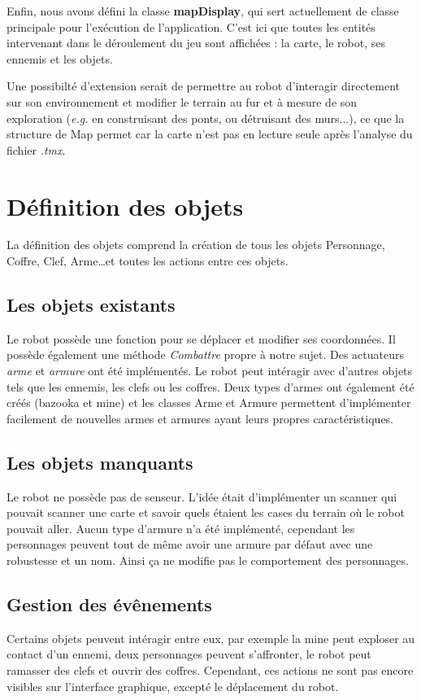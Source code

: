 \documentclass[a4paper 12pts]{article}
\begin{document}
Enfin, nous avons défini la classe \textbf{mapDisplay}, qui sert actuellement de classe principale pour l'exécution de l'application. C'est ici que toutes les entités intervenant dans le déroulement du jeu sont affichées : la carte, le robot, ses ennemis et les objets.

Une possibilté d'extension serait de permettre au robot d'interagir directement sur son environnement et modifier le terrain au fur et à mesure de son exploration (\emph{e.g.} en construisant des ponts, ou détruisant des murs...), ce que la structure de Map permet car la carte n'est pas en lecture seule après l'analyse du fichier \emph{.tmx}. 



\section{Définition des objets}
La définition des objets comprend la création de tous les objets Personnage, Coffre, Clef, Arme\ldots et toutes les actions entre ces objets.

\subsection{Les objets existants}
Le robot possède une fonction pour se déplacer et modifier ses coordonnées. Il possède également une méthode \emph{Combattre} propre à notre sujet. Des actuateurs \emph{arme} et \emph{armure} ont été implémentés. Le robot peut intéragir avec d'autres objets tels que les ennemis, les clefs ou les coffres. Deux types d'armes ont également été créés (bazooka et mine) et les classes Arme et Armure permettent d'implémenter facilement de nouvelles armes et armures ayant leurs propres caractéristiques.

\subsection{Les objets manquants}
Le robot ne possède pas de senseur. L'idée était d'implémenter un scanner qui pouvait scanner une carte et savoir quels étaient les cases du terrain où le robot pouvait aller. Aucun type d'armure n'a été implémenté, cependant les personnages peuvent tout de même avoir une armure par défaut avec une robustesse et un nom. Ainsi ça ne modifie pas le comportement des personnages.

\subsection{Gestion des évênements}
Certains objets peuvent intéragir entre eux, par exemple la mine peut exploser au contact d'un ennemi, deux personnages peuvent s'affronter, le robot peut ramasser des clefs et ouvrir des coffres. Cependant, ces actions ne sont pas encore visibles sur l'interface graphique, excepté le déplacement du robot.
\end{document}
